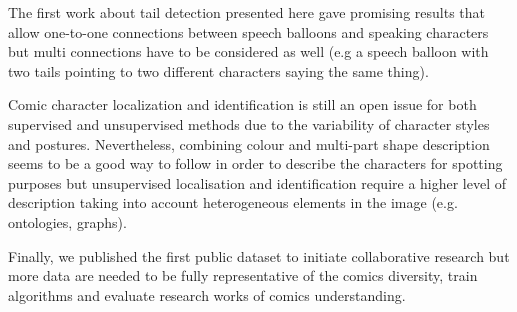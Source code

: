 The first work about tail detection presented here gave promising results that allow one-to-one connections between speech balloons and speaking characters but multi connections have to be considered as well (e.g a speech balloon with two tails pointing to two different characters saying the same thing).

Comic character localization and identification is still an open issue for both supervised and unsupervised methods due to the variability of character styles and postures.
Nevertheless, combining colour and multi-part shape description seems to be a good way to follow in order to describe the characters for spotting purposes but unsupervised localisation and identification require a higher level of description taking into account heterogeneous elements in the image (e.g. ontologies, graphs).

Finally, we published the first public dataset to initiate collaborative research but more data are needed to be fully representative of the comics diversity, train algorithms and evaluate research works of comics understanding.

